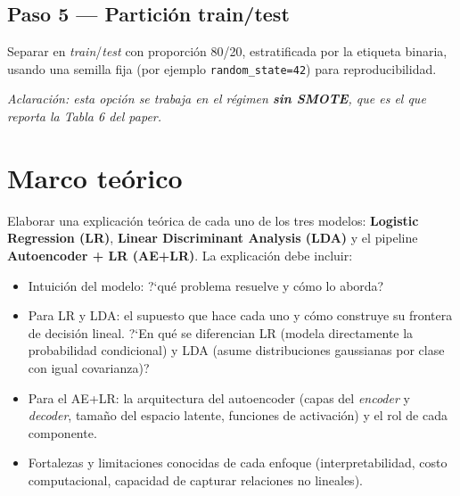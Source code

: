 \documentclass[11pt,a4paper]{article}
\newcommand{\codigo}[1]{\texttt{#1}}
\begin{document}
\subsection*{Paso 5 --- Partici\'on train/test}
Separar en \textit{train}/\textit{test} con proporci\'on 80/20, estratificada por la etiqueta binaria, usando una semilla fija (por ejemplo \codigo{random\_state=42}) para reproducibilidad.

\textit{Aclaraci\'on: esta opci\'on se trabaja en el r\'egimen \textbf{sin SMOTE}, que es el que reporta la Tabla 6 del paper.}

\section{Marco te\'orico}
Elaborar una explicaci\'on te\'orica de cada uno de los tres modelos: \textbf{Logistic Regression (LR)}, \textbf{Linear Discriminant Analysis (LDA)} y el pipeline \textbf{Autoencoder + LR (AE+LR)}. La explicaci\'on debe incluir:
\begin{itemize}[leftmargin=2em,itemsep=2pt]
    \item Intuici\'on del modelo: ?`qu\'e problema resuelve y c\'omo lo aborda?
    \item Para LR y LDA: el supuesto que hace cada uno y c\'omo construye su frontera de decisi\'on lineal. ?`En qu\'e se diferencian LR (modela directamente la probabilidad condicional) y LDA (asume distribuciones gaussianas por clase con igual covarianza)?
    \item Para el AE+LR: la arquitectura del autoencoder (capas del \textit{encoder} y \textit{decoder}, tama\~no del espacio latente, funciones de activaci\'on) y el rol de cada componente.
    \item Fortalezas y limitaciones conocidas de cada enfoque (interpretabilidad, costo computacional, capacidad de capturar relaciones no lineales).
\end{itemize}
\end{document}
